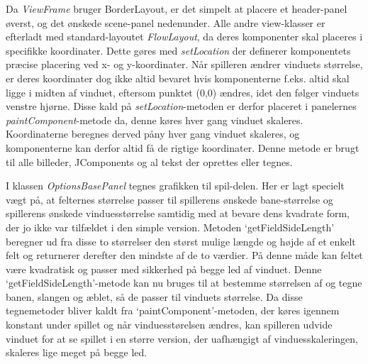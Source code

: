 Da \textit{ViewFrame} bruger BorderLayout, er det simpelt at placere et header-panel øverst, og det ønskede scene-panel nedenunder. Alle andre view-klasser er efterladt med standard-layoutet \textit{FlowLayout}, da deres komponenter skal placeres i specifikke koordinater. Dette gøres med \textit{setLocation} der definerer komponentets præcise placering ved x- og y-koordinater. Når spilleren ændrer vinduets størrelse, er deres koordinater dog ikke altid bevaret hvis komponenterne f.eks. altid skal ligge i midten af vinduet, eftersom punktet (0,0) ændres, idet den følger vinduets venstre hjørne. Disse kald på \textit{setLocation}-metoden er derfor placeret i panelernes \textit{paintComponent}-metode da, denne køres hver gang vinduet skaleres. Koordinaterne beregnes derved påny hver gang vinduet skaleres, og komponenterne kan derfor altid få de rigtige koordinater. Denne metode er brugt til alle billeder, JComponents og al tekst der oprettes eller tegnes.

I klassen \textit{OptionsBasePanel} tegnes grafikken til spil-delen. Her er lagt specielt vægt på, at felternes størrelse passer til spillerens ønskede bane-størrelse og spillerens ønskede vinduesstørrelse samtidig med at bevare dens kvadrate form, der jo ikke var tilfældet i den simple version. Metoden `getFieldSideLength' beregner ud fra disse to størrelser den størst mulige længde og højde af et enkelt felt og returnerer derefter den mindste af de to værdier. På denne måde kan feltet være kvadratisk og passer med sikkerhed på begge led af vinduet. Denne `getFieldSideLength'-metode kan nu bruges til at bestemme størrelsen af og tegne banen, slangen og æblet, så de passer til vinduets størrelse. Da disse tegnemetoder bliver kaldt fra `paintComponent'-metoden, der køres igennem konstant under spillet og når vinduesstørelsen ændres, kan spilleren udvide vinduet for at se spillet i en større version, der uafhængigt af vinduesskaleringen, skaleres lige meget på begge led.

